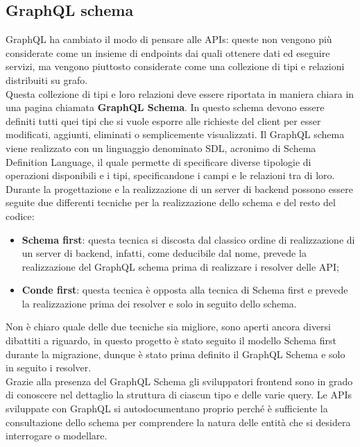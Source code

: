 \subsection*{GraphQL schema}
GraphQL ha cambiato il modo di pensare alle APIs: queste non vengono più considerate come un insieme di endpoints dai quali ottenere dati ed eseguire servizi, ma vengono piuttosto considerate come una collezione di tipi e relazioni distribuiti su grafo.\\
Questa collezione di tipi e loro relazioni deve essere riportata in maniera chiara in una pagina chiamata \textbf{GraphQL Schema}. In questo schema devono essere definiti tutti quei tipi che si vuole esporre alle richieste del client per esser modificati, aggiunti, eliminati o semplicemente visualizzati. Il GraphQL schema viene realizzato con un linguaggio denominato SDL, acronimo di Schema Definition Language, il quale permette di specificare diverse tipologie di operazioni disponibili e i tipi, specificandone i campi e le relazioni tra di loro.\\
Durante la progettazione e la realizzazione di un server di backend possono essere seguite due differenti tecniche per la realizzazione dello schema e del resto del codice:
\begin{itemize}
  \item \textbf{Schema first}: questa tecnica si discosta dal classico ordine di realizzazione di un server di backend, infatti, come deducibile dal nome, prevede la realizzazione del GraphQL schema prima di realizzare i resolver delle API;
  \item \textbf{Conde first}: questa tecnica è opposta alla tecnica di Schema first e prevede la realizzazione prima dei resolver e solo in seguito dello schema.
\end{itemize}
Non è chiaro quale delle due tecniche sia migliore, sono aperti ancora diversi dibattiti a riguardo, in questo progetto è stato seguito il modello Schema first durante la migrazione, dunque è stato prima definito il GraphQL Schema e solo in seguito i resolver.\\
Grazie alla presenza del GraphQL Schema gli sviluppatori frontend sono in grado di conoscere nel dettaglio la struttura di ciascun tipo e delle varie query. Le APIs sviluppate con GraphQL si autodocumentano proprio perché è sufficiente la consultazione dello schema per comprendere la natura delle entità che si desidera interrogare o modellare.\\
